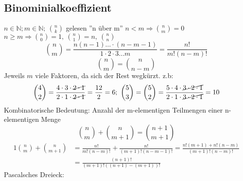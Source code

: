 \subsection{Binominialkoeffizient}
$n \in \mathbb{N}; m \in \mathbb{N};\ \binom{n}{k}$  gelesen ''n über m'' $n < m \Rightarrow \binom{n}{m} = 0$ $n \geq m \Rightarrow \binom{n}{0} = 1,\ \binom{n}{1} = n,\ \binom{n}{n}$
$$\binom{n}{m} = \frac{n(n-1) \dots \cdot (n-m-1)}{1\cdot 2\cdot3 \dots m} = \frac{n!}{m!(n-m)!}$$
$$\binom{n}{m}=\binom{n}{n-m}$$ Jeweils $m$ viele Faktoren, da sich der Rest wegkürzt.
z.b:
$$\binom{4}{2} = \frac{4 \cdot 3 \cdot \cancel{2 \cdot 1}}{2 \cdot 1 \cdot \cancel{2 \cdot 1}} = \frac{12}{2} = 6;\ \binom{5}{3} = \binom{5}{2} = \frac{5 \cdot 4 \cdot  \cancel{3 \cdot 2 \cdot 1}}{2 \cdot 1 \cdot \cancel{3 \cdot 2 \cdot 1}} = 10$$
Kombinatorische Bedeutung: Anzahl der m-elementigen Teilmengen einer n-elementigen Menge
$$\binom{n}{m}+\binom{n}{m+1}=\binom{n+1}{m+1}$$
\begin{alignat*}{1}
    \binom{n}{m}+\binom{n}{m+1} & =\frac{n!}{m!(n-m)!}+\frac{n!}{(m+1)!(n-m-1)!}=\frac{n!(m+1)+n!(n-m)}{(m+1)!(n-m)!} \\
    & =\frac{(n+1)!}{(m+1)!((n+1)-(m+1))!}
\end{alignat*}
Pascalsches Dreieck: \\
